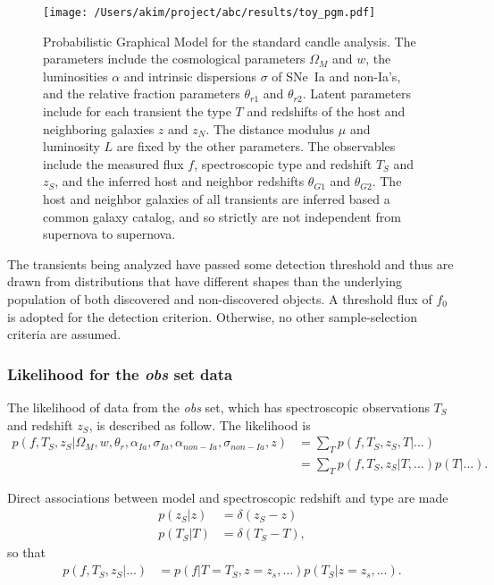 \documentclass[preprint,3p]{elsarticle}
\begin{document}
\begin{figure}[htbp] %
   \centering
   \texttt{[image: /Users/akim/project/abc/results/toy\_pgm.pdf]} 
   \caption{Probabilistic Graphical Model for the standard candle analysis. The
   parameters include the cosmological parameters $\Omega_M$ and $w$,
   the luminosities $\alpha$ and intrinsic dispersions $\sigma$ of SNe~Ia and non-Ia's,
   and the relative fraction parameters $\theta_{r1}$ and $\theta_{r2}$.  Latent parameters
   include 
   for each transient the type $T$ and redshifts of the host and neighboring galaxies $z$ and $z_N$.  The  distance modulus $\mu$ and
   luminosity $L$ are fixed by the other parameters.  The observables include the measured
   flux $f$, spectroscopic type and redshift $T_S$ and $z_S$, and
   the inferred host and neighbor redshifts $\theta_{G1}$ and $\theta_{G2}$.
   The host and neighbor galaxies of all transients are inferred based a common galaxy catalog, 
   and so strictly are not independent from supernova to supernova.
   \label{toypgm:fig}}
\end{figure}


The transients being analyzed have passed some detection threshold
and thus are drawn from
distributions that have different shapes than the underlying population of both discovered and
non-discovered objects. A  threshold flux of $f_0$ is adopted for the detection criterion.
Otherwise, no other sample-selection criteria are assumed.

\subsubsection{Likelihood for the {\it obs} set data}
\label{obs:sec}
The likelihood of data from the {\it obs} set, which has
spectroscopic observations $T_S$ and redshift
$z_S$, is described as follow.  The likelihood is
\begin{align}
p(f, {{T}}_S,{{z}}_S|  \Omega_M, w, \theta_r,\alpha_{Ia},\sigma_{Ia}, \alpha_{\mathit{non-Ia}},\sigma_{\mathit{non-Ia}}, z)  &=\sum_T
p(f, {{T}}_S,{{z}}_S, T| \ldots)\\
&= \sum_T 
p(f, {{T}}_S,{{z}}_S| T,\dots) p(T | \ldots).
\end{align}

Direct associations between model and spectroscopic redshift and type are made
\begin{align}
p(z_S|z) &= \delta(z_S-z)\\
p(T_S|T) &= \delta(T_S-T),
\label{specz:eqn}
\end{align}
so that
\begin{align}
p(f, {{T}}_S,{{z}}_S|  \ldots) &= 
p(f| T=T_S, z=z_s,\dots) p(T_S|z=z_s, \ldots).
\label{obs:eqn}
\end{align}
\end{document}
